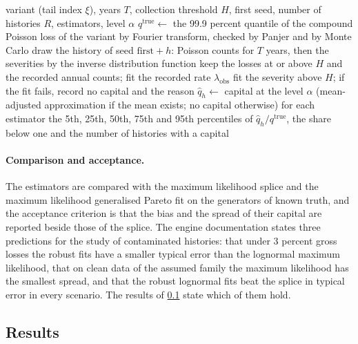 \begin{algorithm}[htbp]
\caption{Ratio of the capital of an estimator to the true quantile over independent histories}
\label{alg:op-replication}
\begin{algorithmic}[1]
\Require variant (tail index $\xi$), years $T$, collection threshold $H$, first seed, number of histories $R$, estimators, level $\alpha$
\State $q^{\mathrm{true}}\leftarrow$ the 99.9 percent quantile of the compound Poisson loss of the variant by Fourier transform, checked by Panjer and by Monte Carlo
\State draw the history of seed $\text{first}+h$: Poisson counts for $T$ years, then the severities by the inverse distribution function
\State keep the losses at or above $H$ and the recorded annual counts; fit the recorded rate $\lambda_{\mathrm{obs}}$
\State fit the severity above $H$; if the fit fails, record no capital and the reason
\State $\hat q_h\leftarrow$ capital at the level $\alpha$ (mean-adjusted approximation if the mean exists; no capital otherwise)
\EndFor
\EndFor
\State \Return for each estimator the 5th, 25th, 50th, 75th and 95th percentiles of $\hat q_h/q^{\mathrm{true}}$, the share below one and the number of histories with a capital
\end{algorithmic}
\end{algorithm}

\paragraph{Comparison and acceptance.} The estimators are compared with the maximum likelihood splice and the maximum likelihood generalised Pareto fit on the generators of known
truth, and the acceptance criterion is that the bias and the spread of their capital are reported beside those of the splice. The engine documentation states three
predictions for the study of contaminated histories: that under 3 percent gross losses the robust fits have a smaller typical error than the lognormal
maximum likelihood, that on clean data of the assumed family the maximum likelihood has the smallest spread, and that the robust lognormal fits beat the splice
in typical error in every scenario. The results of \cref{sec:results-oprisk} state which of them hold.

\subsection{Results}
\label{sec:results-oprisk}

